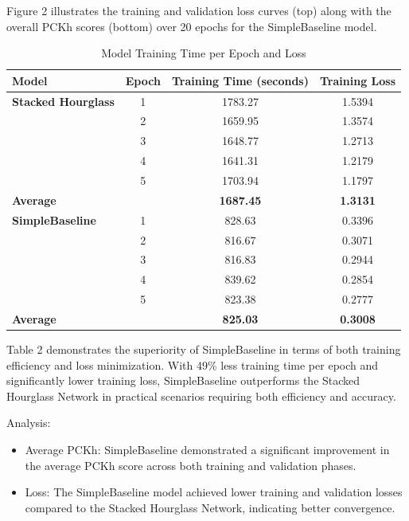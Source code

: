 \documentclass{article}
\begin{document}
Figure 2 illustrates the training and validation loss curves (top) along with the overall PCKh scores (bottom) over 20 epochs for the SimpleBaseline model.

\begin{table}[htpb]
    \centering
    \caption{Model Training Time per Epoch and Loss}
    \label{tab:model_training_time}
    \begin{tabular}{|l|c|c|c|}
        \hline
        \textbf{Model} & \textbf{Epoch} & \textbf{Training Time (seconds)} & \textbf{Training Loss} \\ \hline
        \textbf{Stacked Hourglass} & 1 & 1783.27 & 1.5394 \\ \cline{2-4}
                                 & 2 & 1659.95 & 1.3574 \\ \cline{2-4}
                                 & 3 & 1648.77 & 1.2713 \\ \cline{2-4}
                                 & 4 & 1641.31 & 1.2179 \\ \cline{2-4}
                                 & 5 & 1703.94 & 1.1797 \\ \cline{2-4}
        \textbf{Average}         &   & \textbf{1687.45} & \textbf{1.3131} \\ \hline
        \textbf{SimpleBaseline}  & 1 & 828.63 & 0.3396 \\ \cline{2-4}
                                 & 2 & 816.67 & 0.3071 \\ \cline{2-4}
                                 & 3 & 816.83 & 0.2944 \\ \cline{2-4}
                                 & 4 & 839.62 & 0.2854 \\ \cline{2-4}
                                 & 5 & 823.38 & 0.2777 \\ \cline{2-4}
        \textbf{Average}         &   & \textbf{825.03} & \textbf{0.3008} \\ \hline
    \end{tabular}
\end{table}
Table 2 demonstrates the superiority of SimpleBaseline in terms of both training efficiency and loss minimization. With 49\% less training time per epoch and significantly lower training loss, SimpleBaseline outperforms the Stacked Hourglass Network in practical scenarios requiring both efficiency and accuracy.

Analysis:
\begin{itemize}
\item  Average PCKh: SimpleBaseline demonstrated a significant improvement in the average PCKh score across both training and validation phases.
\item Loss: The SimpleBaseline model achieved lower training and validation losses compared to the Stacked Hourglass Network, indicating better convergence.
\end{itemize}
\end{document}
